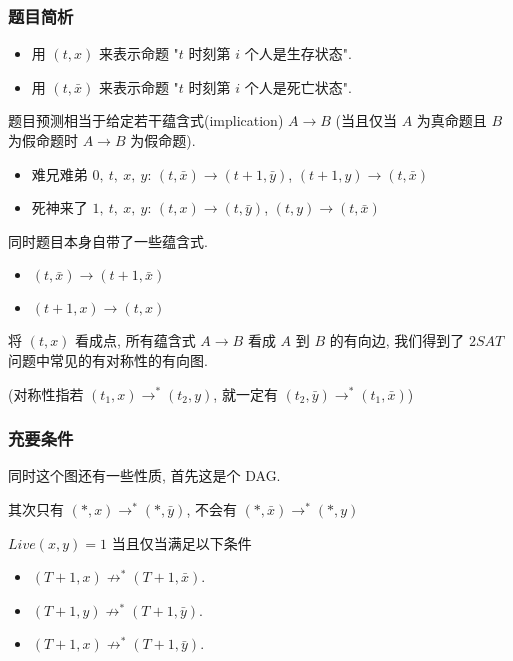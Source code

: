 \documentclass{beamer}
\begin{document}
\begin{frame}
\frametitle{题目简析}

\begin{itemize}
	\item 用 $(t, x)$ 来表示命题 "$t$ 时刻第 $i$ 个人是生存状态".
	\item 用 $(t, \bar{x})$ 来表示命题 "$t$ 时刻第 $i$ 个人是死亡状态".
\end{itemize}

题目预测相当于给定若干蕴含式(implication) $A \to B$ (当且仅当 $A$ 为真命题且 $B$ 为假命题时 $A\to B$ 为假命题). 

\begin{itemize}
	\item 难兄难弟 $0,\ t,\ x,\ y$: $(t, \bar{x}) \to (t + 1, \bar{y})$, $(t + 1, y) \to (t, \bar{x})$
	\item 死神来了 $1,\ t,\ x,\ y$: $(t, x) \to (t, \bar{y})$, $(t, y) \to (t, \bar{x})$
\end{itemize}

同时题目本身自带了一些蕴含式.

\begin{itemize}
	\item $(t, \bar{x}) \to (t + 1, \bar{x})$
	\item $(t+1, x) \to (t, x)$
\end{itemize}

将 $(t, x)$ 看成点, 所有蕴含式 $A\to B$ 看成 $A$ 到 $B$ 的有向边, 我们得到了 $2SAT$ 问题中常见的有对称性的有向图. 

(对称性指若 $(t_1, x) \to^* (t_2, y)$, 就一定有 $(t_2, \bar{y}) \to^* (t_1, \bar{x})$)

\end{frame}


\begin{frame}
\frametitle{充要条件}
同时这个图还有一些性质, 首先这是个 DAG. 

其次只有 $(*, x) \to^{*} (*, \bar{y})$, 不会有 $(*, \bar{x}) \to^{*} (*, y)$

$Live(x, y) = 1$ 当且仅当满足以下条件

\begin{itemize}
	\item $(T+1, x) \not\to^{*} (T+1, \bar{x})$.
	\item $(T+1, y) \not\to^{*} (T+1, \bar{y})$.
	\item $(T+1, x) \not\to^{*} (T+1, \bar{y})$.
\end{itemize}

\end{frame}
\end{document}
